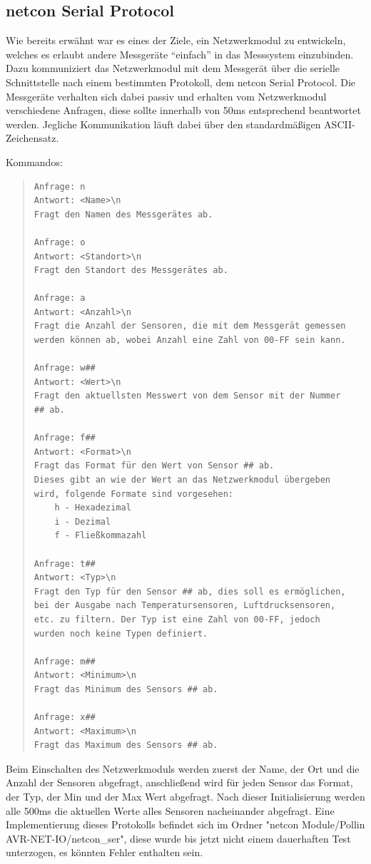 \documentclass[a4paper,14pt,headsepline]{scrartcl}
\begin{document}
\subsection{netcon Serial Protocol}
Wie bereits erwähnt war es eines der Ziele, ein Netzwerkmodul zu entwickeln, welches es erlaubt andere Messgeräte "`einfach"' in das Messsystem einzubinden. Dazu kommuniziert das Netzwerkmodul mit dem Messgerät über die serielle Schnittstelle nach einem bestimmten Protokoll, dem netcon Serial Protocol. Die Messgeräte verhalten sich dabei passiv und erhalten vom Netzwerkmodul verschiedene Anfragen, diese sollte innerhalb von 50ms entsprechend beantwortet werden. Jegliche Kommunikation läuft dabei über den standardmäßigen ASCII-Zeichensatz.

Kommandos:
\begin{quote}
\begin{verbatim}
Anfrage: n
Antwort: <Name>\n
Fragt den Namen des Messgerätes ab.

Anfrage: o
Antwort: <Standort>\n
Fragt den Standort des Messgerätes ab.

Anfrage: a
Antwort: <Anzahl>\n
Fragt die Anzahl der Sensoren, die mit dem Messgerät gemessen
werden können ab, wobei Anzahl eine Zahl von 00-FF sein kann.

Anfrage: w##
Antwort: <Wert>\n
Fragt den aktuellsten Messwert von dem Sensor mit der Nummer
## ab.

Anfrage: f##
Antwort: <Format>\n
Fragt das Format für den Wert von Sensor ## ab.
Dieses gibt an wie der Wert an das Netzwerkmodul übergeben
wird, folgende Formate sind vorgesehen:
    h - Hexadezimal
    i - Dezimal
    f - Fließkommazahl
    
Anfrage: t##
Antwort: <Typ>\n
Fragt den Typ für den Sensor ## ab, dies soll es ermöglichen,
bei der Ausgabe nach Temperatursensoren, Luftdrucksensoren,
etc. zu filtern. Der Typ ist eine Zahl von 00-FF, jedoch
wurden noch keine Typen definiert.

Anfrage: m##
Antwort: <Minimum>\n
Fragt das Minimum des Sensors ## ab.

Anfrage: x##
Antwort: <Maximum>\n
Fragt das Maximum des Sensors ## ab.
\end{verbatim}
\end{quote}

Beim Einschalten des Netzwerkmoduls werden zuerst der Name, der Ort und die Anzahl der Sensoren abgefragt, anschließend wird für jeden Sensor das Format, der Typ, der Min und der Max Wert abgefragt. Nach dieser Initialisierung werden alle 500ms die aktuellen Werte alles Sensoren nacheinander abgefragt. Eine Implementierung dieses Protokolls befindet sich im Ordner "netcon Module/Pollin AVR-NET-IO/netcon\_ser", diese wurde bis jetzt nicht einem dauerhaften Test unterzogen, es könnten Fehler enthalten sein.
\end{document}
